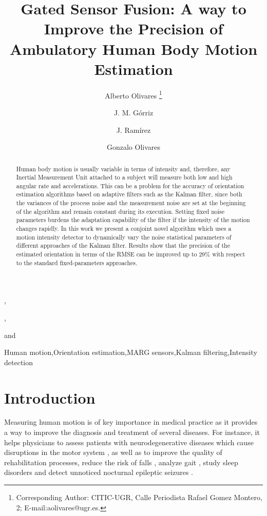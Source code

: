 \documentclass{IOS-Book-Article}
\begin{document}
\begin{frontmatter}              %

\title{Gated Sensor Fusion: A way to Improve the Precision of Ambulatory Human Body Motion Estimation}

\author[A]{Alberto Olivares%
\thanks{Corresponding Author: CITIC-UGR, Calle Periodista Rafael Gomez Montero, 2; E-mail:aolivares@ugr.es.}},
\author[A]{J. M. G\'orriz},
\author[A]{J. Ram\'irez}
and
\author[B]{Gonzalo Olivares}


\address[A]{Dept. of Signal Processing, Telematics and Communications (TSTC), University of Granada, SPAIN}
\address[B]{Dept. of Computer Architecture and Computer Technology (ATC), University of Granada, SPAIN}

\begin{abstract}
Human body motion is usually variable in terms of intensity and, therefore, any Inertial Measurement Unit attached to a subject will measure both low and high angular rate and accelerations. This can be a problem for the accuracy of orientation estimation algorithms based on adaptive filters such as the Kalman filter, since both the variances of the process noise and the measurement noise are set at the beginning of the algorithm and remain constant during its execution. Setting fixed noise parameters burdens the adaptation capability of the filter if the intensity of the motion changes rapidly. In this work we present a conjoint novel algorithm which uses a motion intensity detector to dynamically vary the noise statistical parameters of different approaches of the Kalman filter. Results show that the precision of the estimated orientation in terms of the RMSE can be improved up to 29\% with respect to the standard fixed-parameters approaches.
\end{abstract}

\begin{keyword}
Human motion\sep Orientation estimation\sep MARG sensors\sep Kalman filtering\sep Intensity detection 
\end{keyword}

\end{frontmatter}

\thispagestyle{empty}
\pagestyle{empty}

\section{Introduction}
\label{sec:introduction}
\indent \indent Measuring human motion is of key importance in medical practice as it provides a way to improve the diagnosis and treatment of several diseases. For instance, it helps physicians to assess patients with neurodegenerative diseases which cause disruptions in the motor system \cite{sprdlik_tremor_2009}, as well as to improve the quality of rehabilitation processes\cite{yaqin_tao_novel_2008}, reduce the risk of falls \cite{howcroft2013}, analyze gait \cite{macwilliams_functional_2010}, study sleep disorders \cite{Tang2004} and detect unnoticed nocturnal epileptic seizures \cite{Poh2012}.
\end{document}
